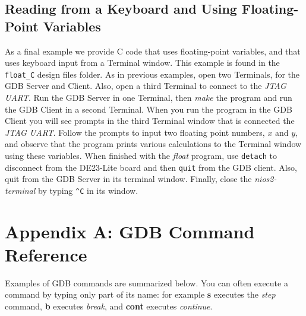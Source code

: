 \documentclass[11pt, twoside, pdftex]{article}
\begin{document}
\subsection{Reading from a Keyboard and Using Floating-Point Variables}

As a final example we provide C code that uses floating-point variables, and that uses
keyboard input from a Terminal window. This example is found in the \texttt{float\_C} design 
files folder. As in previous examples, open two Terminals, for the GDB Server and Client.
Also, open a third Terminal to connect to the {\it JTAG UART}. Run the GDB Server in one
Terminal, then {\it make} the program and run the GDB Client in a second Terminal. When
you run the program in the GDB Client you will see prompts in the third Terminal window
that is connected the {\it JTAG UART}. Follow the prompts to input two floating point
numbers, $x$ and $y$, and observe that the program prints various calculations to the
Terminal window using these variables. 
When finished with the {\it float} program, use \texttt{detach} to disconnect from the 
DE23-Lite board and then \texttt{quit} from the GDB client. Also, quit from the GDB Server in 
its terminal window. Finally, close the {\it nios2-terminal} by 
typing \texttt{\textasciicircum C} in its window.

\newpage
\section*{Appendix A: GDB Command Reference}

Examples of GDB commands are summarized below. You can often execute a command by typing
only part of its name: for example {\bf s} executes the {\it step} command, {\bf b} executes
{\it break}, and {\bf cont} executes {\it continue}.
\end{document}
